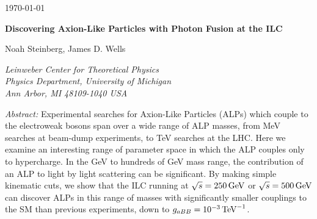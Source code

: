 \documentclass[aps,onecolumn,twoside,secnumarabic,12pt,balancelastpage,amsmath,amssymb,nofootinbib,hyperref=pdftex]{revtex4}
\begin{document}
\begin{flushright}
\today
\end{flushright}

\vspace{0.07in}

\noindent
\begin{center}

{\bf\large Discovering Axion-Like Particles with Photon Fusion at the ILC}

\vspace{0.5cm}
{Noah Steinberg, James D. Wells}

{\it Leinweber Center for Theoretical Physics \\
Physics Department, University of Michigan \\
Ann Arbor, MI 48109-1040 USA}\\
\end{center}

\noindent
{\it Abstract:}
Experimental searches for Axion-Like Particles (ALPs) which couple to the electroweak bosons span over a wide range of ALP masses, from MeV searches at beam-dump experiments, to TeV searches at the LHC. Here we examine an interesting range of parameter space in which the ALP couples only to hypercharge. In the GeV to hundreds of GeV mass range, the contribution of an ALP to light by light scattering can be significant. By making simple kinematic cuts, we show that the ILC running at $\sqrt{s} = 250\,\rm{GeV}$ or $\sqrt{s} = 500\,\rm{GeV}$ can discover ALPs in this range of masses with significantly smaller couplings to the SM than previous experiments, down to  $g_{aBB} = 10^{-3}\,\rm{TeV}^{-1}$.
\vfill\eject
\end{document}
